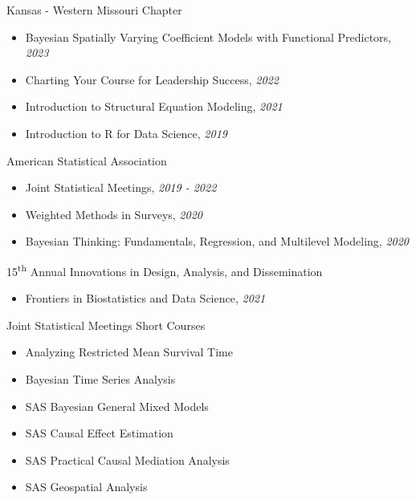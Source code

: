 
\Development
{Kansas - Western Missouri Chapter}
{\begin{itemize}
    \item Bayesian Spatially Varying Coefficient Models with Functional Predictors, \emph{2023}
    \item Charting Your Course for Leadership Success, \emph{2022}
    \item Introduction to Structural Equation Modeling, \emph{2021}
    \item Introduction to R for Data Science, \emph{2019}
\end{itemize}}

\Development
{American Statistical Association}
{\begin{itemize}
    \item Joint Statistical Meetings, \emph{2019 - 2022}
    \item Weighted Methods in Surveys, \emph{2020}
    \item Bayesian Thinking: Fundamentals, Regression, and Multilevel
            Modeling, \emph{2020}
\end{itemize}}

\Development
{15\textsuperscript{th} Annual Innovations in Design, Analysis, and Dissemination}
{\begin{itemize}
    \item Frontiers in Biostatistics and Data Science, \emph{2021}
\end{itemize}}

\Development
{Joint Statistical Meetings Short Courses}
{\begin{itemize}
    \item Analyzing Restricted Mean Survival Time
    \item Bayesian Time Series Analysis
    \item SAS Bayesian General Mixed Models
    \item SAS Causal Effect Estimation
    \item SAS Practical Causal Mediation Analysis
    \item SAS Geospatial Analysis
\end{itemize}}